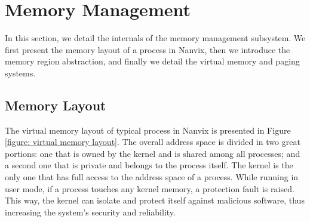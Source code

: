 \section{Memory Management}

	In this section, we detail the internals of the memory management
	subsystem. We first present the memory layout of a process in
	Nanvix, then we introduce the memory region abstraction, and finally
	we detail the virtual memory and paging systems.

\subsection{Memory Layout}
\label{subsection: memory layout}

	The virtual memory layout of typical process in Nanvix is presented
	in Figure \ref{figure: virtual memory layout}. The overall address
	space is divided in two great portions: one that is owned by the
	kernel and is shared among all processes; and a second one that is
	private and belongs to the process itself. The kernel is the only
	one that has full access to the address space of a process. While
	running in user mode, if a process touches any kernel memory, a
	protection fault is raised. This way, the kernel can isolate and
	protect itself against malicious software, thus increasing the
	system's security and reliability.

